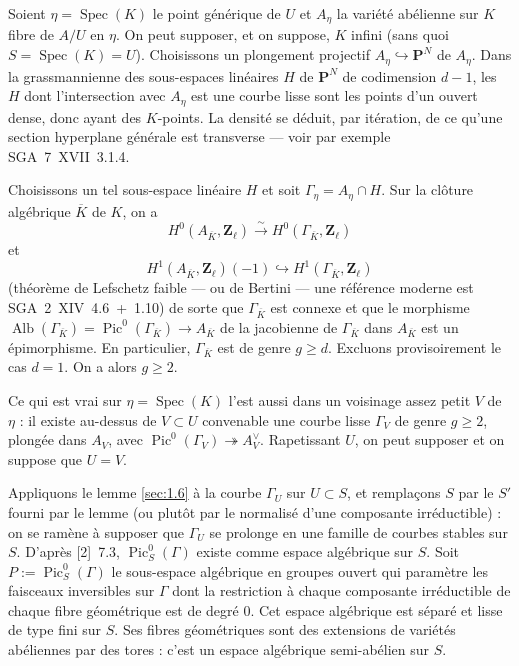 \documentclass[12pt,a4paper]{article}
\theoremstyle{plain}
\theoremstyle{definition}
\theoremstyle{remark}
\DeclareMathOperator{\Pic}{Pic}
\DeclareMathOperator{\Spec}{Spec}
\DeclareMathOperator{\Alb}{Alb}
\begin{document}
Soient $\eta = \Spec(K)$ le point générique de $U$ et $A_\eta$ la variété abélienne sur $K$ fibre de $A/U$ en $\eta$. On peut supposer, et on suppose, $K$ infini (sans quoi $S = \Spec(K) = U$). Choisissons un plongement projectif $A_\eta \hookrightarrow \mathbf{P}^N$ de $A_\eta$. Dans la grassmannienne des sous-espaces linéaires $H$ de $\mathbf{P}^N$ de codimension $d-1$, les $H$ dont l'intersection avec $A_\eta$ est une courbe lisse sont les points d'un ouvert dense, donc ayant des $K$-points. La densité se déduit, par itération, de ce qu'une section hyperplane générale est transverse --- voir par exemple SGA~7~XVII~3.1.4.

Choisissons un tel sous-espace linéaire $H$ et soit $\Gamma_\eta = A_\eta \cap H$. Sur la clôture algébrique $\overline{K}$ de $K$, on a
\[
H^0(A_{\overline{K}}, \mathbf{Z}_\ell) \xrightarrow{\sim} H^0(\Gamma_{\overline{K}}, \mathbf{Z}_\ell)
\]
et
\[
H^1(A_{\overline{K}}, \mathbf{Z}_\ell)(-1) \hookrightarrow H^1(\Gamma_{\overline{K}}, \mathbf{Z}_\ell)
\]
(théorème de Lefschetz faible --- ou de Bertini --- une référence moderne est SGA~2~XIV~4.6~+~1.10) de sorte que $\Gamma_{\overline{K}}$ est connexe et que le morphisme $\Alb(\Gamma_{\overline{K}}) = \Pic^0(\Gamma_{\overline{K}}) \to A_{\overline{K}}$ de la jacobienne de $\Gamma_{\overline{K}}$ dans $A_{\overline{K}}$ est un épimorphisme. En particulier, $\Gamma_{\overline{K}}$ est de genre $g \geq d$. Excluons provisoirement le cas $d = 1$. On a alors $g \geq 2$.

Ce qui est vrai sur $\eta = \Spec(K)$ l'est aussi dans un voisinage assez petit $V$ de $\eta$ : il existe au-dessus de $V \subset U$ convenable une courbe lisse $\Gamma_V$ de genre $g \geq 2$, plongée dans $A_V$, avec $\Pic^0(\Gamma_V) \twoheadrightarrow A_V^\vee$. Rapetissant $U$, on peut supposer et on suppose que $U = V$.

Appliquons le lemme \ref{sec:1.6} à la courbe $\Gamma_U$ sur $U \subset S$, et remplaçons $S$ par le $S'$ fourni par le lemme (ou plutôt par le normalisé d'une composante irréductible) : on se ramène à supposer que $\Gamma_U$ se prolonge en une famille de courbes stables sur $S$. D'après [2]~7.3, $\Pic_S^0(\Gamma)$ existe comme espace algébrique sur $S$. Soit $P := \Pic_S^0(\Gamma)$ le sous-espace algébrique en groupes ouvert qui paramètre les faisceaux inversibles sur $\Gamma$ dont la restriction à chaque composante irréductible de chaque fibre géométrique est de degré $0$. Cet espace algébrique est séparé et lisse de type fini sur $S$. Ses fibres géométriques sont des extensions de variétés abéliennes par des tores : c'est un espace algébrique semi-abélien sur $S$.
\end{document}
